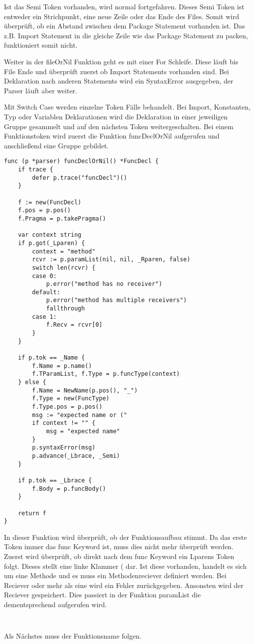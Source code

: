 Ist das Semi Token vorhanden, wird normal fortgefahren. Dieses Semi Token ist entweder ein Strichpunkt, eine neue Zeile oder das Ende des Files. Somit wird überprüft, ob ein Abstand zwischen dem Package Statement vorhanden ist. Das z.B. Import Statement in die gleiche Zeile wie das Package Statement zu packen, funktioniert somit nicht.

Weiter in der fileOrNil Funktion geht es mit einer For Schleife. Diese läuft bis File Ende und überprüft zuerst ob Import Statements vorhanden sind. Bei Deklaration nach anderen Statements wird ein SyntaxError ausgegeben, der Parser läuft aber weiter. 

Mit Switch Case werden einzelne Token Fälle behandelt. Bei Import, Konstanten, Typ oder Variablen Deklarationen wird die Deklaration in einer jeweiligen Gruppe gesammelt und auf den nächsten Token weitergeschalten. Bei einem Funktionstoken wird zuerst die Funktion funcDeclOrNil aufgerufen und anschließend eine Gruppe gebildet.

\begin{lstlisting}
func (p *parser) funcDeclOrNil() *FuncDecl {
	if trace {
		defer p.trace("funcDecl")()
	}

	f := new(FuncDecl)
	f.pos = p.pos()
	f.Pragma = p.takePragma()

	var context string
	if p.got(_Lparen) {
		context = "method"
		rcvr := p.paramList(nil, nil, _Rparen, false)
		switch len(rcvr) {
		case 0:
			p.error("method has no receiver")
		default:
			p.error("method has multiple receivers")
			fallthrough
		case 1:
			f.Recv = rcvr[0]
		}
	}

	if p.tok == _Name {
		f.Name = p.name()
		f.TParamList, f.Type = p.funcType(context)
	} else {
		f.Name = NewName(p.pos(), "_")
		f.Type = new(FuncType)
		f.Type.pos = p.pos()
		msg := "expected name or ("
		if context != "" {
			msg = "expected name"
		}
		p.syntaxError(msg)
		p.advance(_Lbrace, _Semi)
	}

	if p.tok == _Lbrace {
		f.Body = p.funcBody()
	}

	return f
}
\end{lstlisting}
In dieser Funktion wird überprüft, ob der Funktionsaufbau stimmt. Da das erste Token immer das func Keyword ist, muss dies nicht mehr überprüft werden. Zuerst wird überprüft, ob direkt nach dem func Keyword ein Lparens Token folgt. Dieses stellt eine linke Klammer ( dar. Ist diese vorhanden, handelt es sich um eine Methode und es muss ein Methodenreciever definiert werden. Bei Reciever oder  mehr als eine wird ein Fehler zurückgegeben. Ansonsten wird der Reciever gespeichert. Dies passiert in der Funktion paramList die dementsprechend aufgerufen wird.
\begin{lstlisting}
    
\end{lstlisting}
Als Nächstes muss der Funktionsname folgen. 


